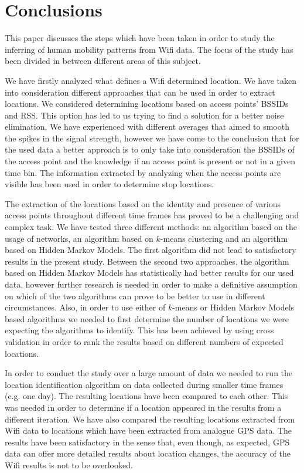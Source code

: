 \chapter{Conclusions}

This paper discusses the steps which have been taken in order to study the
inferring of human mobility patterns from Wifi data. The focus of the study has
been divided in between different areas of this subject. 

We have firstly analyzed what defines a Wifi determined location. We have taken
into consideration different approaches that can be used in order to extract
locations. We considered determining locations based on access points' BSSIDs
and RSS. This option has led to us trying to find a solution for a better noise
elimination. We have experienced with different averages that aimed to smooth
the spikes in the signal strength, however we have come to the conclusion that
for the used data a better approach is to only take into consideration the
BSSIDs of the access point and the knowledge if an access point is present or
not in a given time bin. The information extracted by analyzing when the access
points are visible has been used in order to determine stop locations.

The extraction of the locations based on the identity and presence of various
access points throughout different time frames has proved to be a challenging
and complex task. We have tested three different methods: an algorithm based on
the usage of networks, an algorithm based on $k$-means clustering and an
algorithm based on Hidden Markov Models. The first algorithm did not lead to satisfactory
results in the present study. Between the second two approaches, the algorithm
based on Hidden Markov Models has statistically had better results for our
used data, however further research is needed in order to make a definitive
assumption on which of the two algorithms can prove to be better to use in
different circumstances. Also, in order to use either of $k$-means or Hidden
Markov Models based algorithms we needed to first determine the number of
locations we were expecting the algorithms to identify. This has been achieved
by using cross validation in order to rank the results based on different
numbers of expected locations.

In order to conduct the study over a large amount of data we needed to run the
location identification algorithm on data collected during smaller time frames
(e.g. one day). The resulting locations have been compared to each other. This
was needed in order to determine if a location appeared in the results from a
different iteration. We have also compared the resulting locations extracted
from Wifi data to locations which have been extracted from analogue GPS data.
The results have been satisfactory in the sense that, even though, as expected,
GPS data can offer more detailed results about location changes, the accuracy
of the Wifi results is not to be overlooked.


